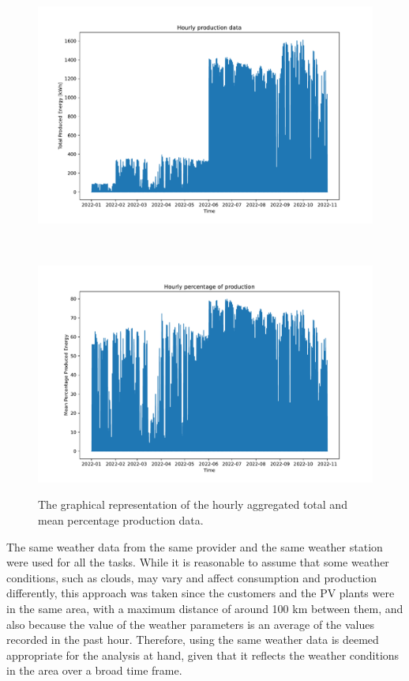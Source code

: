 \begin{figure}[H]
\begin{minipage}[b]{8.5cm}
\centering
\includegraphics[width=1\textwidth]{images/production/data_plot}
\subcaption{}
\label{fig:productiondataplot}
\end{minipage}
\ \hspace{2mm} \
\begin{minipage}[b]{8.5cm}
\centering
\includegraphics[width=1\textwidth]{images/production/data_plot_percentage}
\subcaption{}
\label{fig:productiondataplotpercentage}
\end{minipage}
\caption{The graphical representation of the hourly aggregated  total and  mean percentage production data.}
\end{figure}

The same weather data from the same provider and the same weather station were used for all the tasks.
While it is reasonable to assume that some weather conditions, such as clouds, may vary and affect consumption and production differently, this approach was taken since the customers and the PV plants were in the same area, with a maximum distance of around 100 km between them, and also because the value of the weather parameters is an average of the values recorded in the past hour.
Therefore, using the same weather data is deemed appropriate for the analysis at hand, given that it reflects the weather conditions in the area over a broad time frame.


